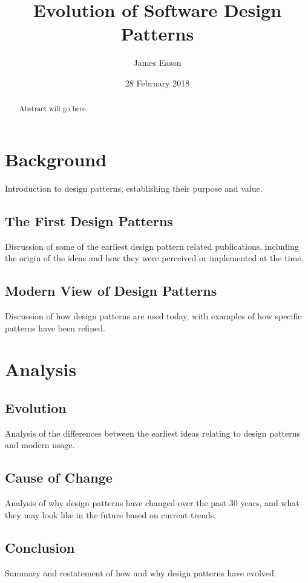 \documentclass[11pt]{article}
\title{Evolution of Software Design Patterns}
\author{James Eason}
\date{28 February 2018}
\begin{document}
\maketitle

\thispagestyle{empty}

\begin{abstract}
  Abstract will go here.
\end{abstract}

\section{Background}

Introduction to design patterns, establishing their purpose and value.

\subsection{The First Design Patterns}
Discussion of some of the earliest design pattern related publications, including the origin of the ideas and how they were perceived or implemented at the time. 

\subsection{Modern View of Design Patterns}
Discussion of how design patterns are used today, with examples of how specific patterns have been refined.

\section{Analysis}

\subsection{Evolution}
Analysis of the differences between the earliest ideas relating to design patterns and modern usage.

\subsection{Cause of Change}
Analysis of why design patterns have changed over the past 30 years, and what they may look like in the future based on current trends.

\subsection{Conclusion}
Summary and restatement of how and why design patterns have evolved.

\nocite{seffah2010, agerbo1998, erl2009, alexander1999, beck1987}



\end{document}
